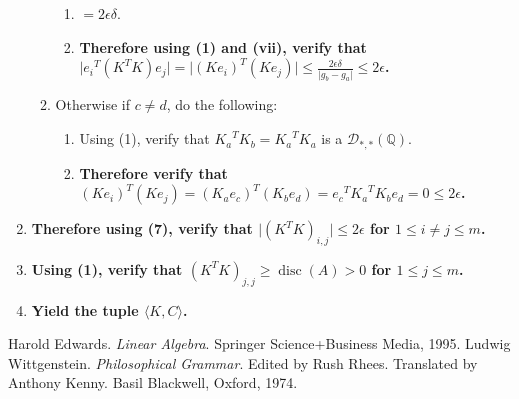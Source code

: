 \documentclass[twocolumn]{article}
\DeclareMathOperator{\disc}{disc}
\begin{document}
\begin{enumerate}
\begin{enumerate}
\begin{enumerate}
							\item $=2\epsilon\delta$.
							\item \textbf{Therefore using (1) and (vii), verify that $\lvert {e_i}^T(K^TK)e_j\rvert=\lvert(Ke_i)^T(Ke_j)\rvert\le\frac{2\epsilon\delta}{\lvert g_b-g_a\rvert}\le 2\epsilon$.}
						\end{enumerate}
						\item Otherwise if $c\ne d$, do the following:
						\begin{enumerate}
							\item Using (1), verify that ${K_a}^TK_b={K_a}^TK_a$ is a $\mathcal{D}_{*,*}(\mathbb{Q})$.
							\item \textbf{Therefore verify that $(Ke_i)^T(Ke_j)=(K_ae_c)^T(K_be_d)={e_c}^T{K_a}^TK_be_d=0\le 2\epsilon$.}
						\end{enumerate}
					\end{enumerate}
					\item \textbf{Therefore using (7), verify that $\lvert(K^TK)_{i,j}\rvert\le 2\epsilon$ for $1\le i\ne j\le m$.}
					\item \textbf{Using (1), verify that $(K^TK)_{j,j}\ge\disc(A)>0$ for $1\le j\le m$.}
					\item \textbf{Yield the tuple $\langle K,C\rangle$.}
				\end{enumerate}
	\begin{thebibliography}{9}
			Harold Edwards.
			\textit{Linear Algebra}. 
			Springer Science+Business Media, 1995.
			Ludwig Wittgenstein.
			\textit{Philosophical Grammar}.
			Edited by Rush Rhees.
			Translated by Anthony Kenny.
			Basil Blackwell, Oxford, 1974.
	\end{thebibliography}
\end{document}
